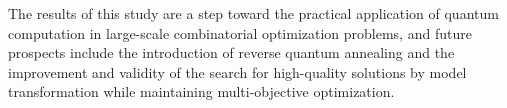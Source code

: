 \documentclass[a4j,12pt]{jreport}
\begin{document}
The results of this study are a step toward the practical application of quantum computation in large-scale combinatorial optimization problems, and future prospects include the introduction of reverse quantum annealing and the improvement and validity of the search for high-quality solutions by model transformation while maintaining multi-objective optimization.
\listoffigures		%
\listoftables		%










%





%
\end{document}
